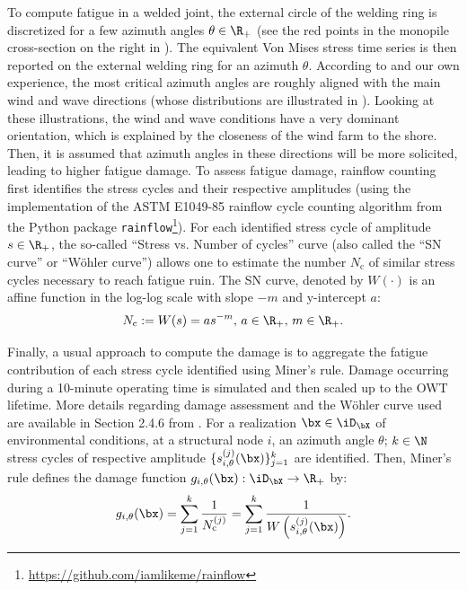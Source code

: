 To compute fatigue in a welded joint, the external circle of the welding ring is discretized for a few azimuth angles $\theta \in \R_+$ (see the red points in the monopile cross-section on the right in ). 
The equivalent Von Mises stress time series is then reported on the external welding ring for an azimuth $\theta$. 
According to \cite{li_zhan_2020} and our own experience, the most critical azimuth angles are roughly aligned with the main wind and wave directions (whose distributions are illustrated in ). 
Looking at these illustrations, the wind and wave conditions have a very dominant orientation, which is explained by the closeness of the wind farm to the shore. 
Then, it is assumed that azimuth angles in these directions will be more solicited, leading to higher fatigue damage. 
To assess fatigue damage, rainflow counting \citep{dowling_1972} first identifies the stress cycles and their respective amplitudes (using the implementation of the ASTM E1049-85 rainflow cycle counting algorithm from the Python package \texttt{rainflow}\footnote{\href{https://github.com/iamlikeme/rainflow}{https://github.com/iamlikeme/rainflow}}). 
For each identified stress cycle of amplitude $s \in \R_+$, the so-called ``Stress vs. Number of cycles'' curve (also called the ``SN curve'' or ``W\"ohler curve'') allows one to estimate the number $N_{\mathrm{c}}$ of similar stress cycles necessary to reach fatigue ruin. 
The SN curve, denoted by $W(\cdot)$ is an affine function in the log-log scale with slope $-m$ and y-intercept $a$:
\begin{equation}
    N_{\mathrm{c}} := W(s) = a s^{-m}, \, a\in\R_+, \, m\in\R_+.
    \label{eq:wohler}
\end{equation}

Finally, a usual approach to compute the damage is to aggregate the fatigue contribution of each stress cycle identified using Miner’s rule. 
Damage occurring during a 10-minute operating time is simulated and then scaled up to the OWT lifetime. 
More details regarding damage assessment and the W\"ohler curve used are available in Section 2.4.6 from \citep{dnv_fatigue_2016}. 
For a realization $\bx \in \iD_{\bX}$ of environmental conditions, at a structural node $i$, an azimuth angle $\theta$; $k \in \N$ stress cycles of respective amplitude $\{s_{i, \theta}^{(j)}(\bx)\}_{j=1}^k$ are identified. 
Then, Miner's rule \citep{fatemi_1998} defines the damage function $g_{i, \theta}(\bx): \iD_{\bX} \rightarrow \R_+$ by:
\begin{equation}
    g_{i, \theta}(\bx) = \sum_{j=1}^{k} \frac{1}{N_{\mathrm{c}}^{(j)}} = \sum_{j=1}^{k} \frac{1}{W\left(s_{i, \theta}^{(j)}(\bx)\right)}.
    \label{miner1}
\end{equation}

